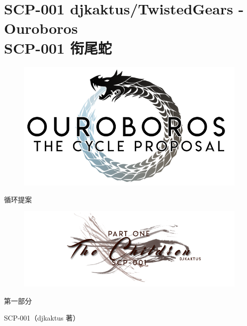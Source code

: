 \chapter[SCP-001 衔尾蛇]{
	SCP-001 djkaktus/TwistedGears - Ouroboros\\
	SCP-001 衔尾蛇
}

\label{chap:SCP-001.ouroboros}

\begin{figure}[H]
    \centering
    \includegraphics[width=0.8\linewidth]{images/SCP-001-ouroboros.png}
\end{figure}

\begin{scpbox}
\begin{center}

循环提案
\end{center}
\end{scpbox}

\hr

\begin{figure}[H]
    \centering
    \includegraphics[width=0.8\linewidth]{images/SCP-001-ouroboros-2.png}
\end{figure}

\begin{scpbox}
\begin{center}
第一部分


SCP-001（djkaktus 著）
\end{center}
\end{scpbox}

